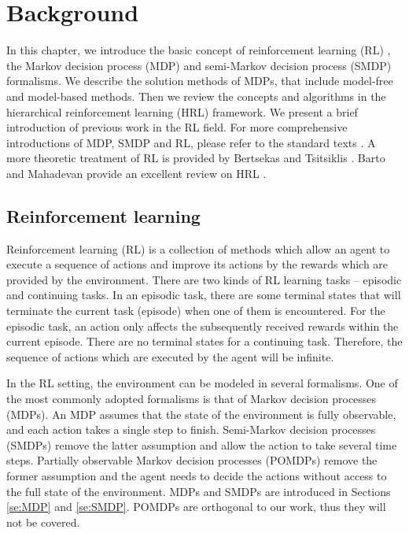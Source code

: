 \chapter{Background}
\label{ch:RL}

In this chapter, we introduce the basic concept of reinforcement learning (RL)
, the Markov decision process (MDP) and semi-Markov decision process (SMDP) formalisms. We describe the solution methods of MDPs, that include model-free and model-based 
methods. Then we review the concepts and algorithms in the hierarchical reinforcement learning (HRL) framework. 
We present a brief introduction of previous work in the RL field.
For more comprehensive introductions of MDP, SMDP and RL, please refer to the standard texts
\cite{Howard1960, Puterman94, SuttonIntro, KevinIntro}.
A more theoretic treatment of RL is provided by Bertsekas and Tsitsiklis \cite{Neurodynamic}.
Barto and Mahadevan provide an excellent review on HRL \cite{HRLSurvey}.

\section{Reinforcement learning}
\label{se:RL}
Reinforcement learning (RL) is a collection of methods which allow an agent to execute
a sequence of actions and improve its actions by the rewards which are provided by the environment.
There are two kinds of RL learning tasks -- episodic and continuing tasks.
In an episodic task, there are some terminal states that will terminate
the current task (episode) when one of them is encountered.
For the episodic task, an action only affects the subsequently received rewards
within the current episode.
There are no terminal states for a continuing task. Therefore, the sequence of actions which
are executed by the agent will be infinite. 

In the RL setting, the environment can be modeled in several formalisms.
One of the most commonly adopted formalisms is that of Markov decision processes (MDPs).
An MDP assumes that the state of the environment is fully observable, and each action takes a single
step to finish. Semi-Markov decision processes (SMDPs) remove the latter assumption and allow
the action to take several time steps. Partially observable Markov decision processes (POMDPs) remove
the former assumption and the agent needs to decide the actions without access to the full state
of the environment.
MDPs and SMDPs are introduced in Sections \ref{se:MDP} and \ref{se:SMDP}.
POMDPs are orthogonal to our work, thus they will not be covered.

